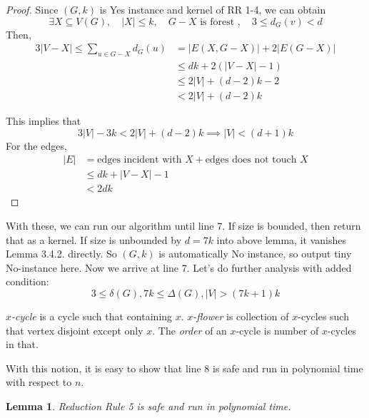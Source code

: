 \documentclass[12pt, a4paper, openany, twoside]{book}
\newtheorem{lem}[thm]{Lemma}
\theoremstyle{definition}
\theoremstyle{remark}
\theoremstyle{plain}
\numberwithin{equation}{section}
\begin{document}
\begin{proof}
    
Since $(G, k)$ is Yes instance and kernel of RR 1-4, we can obtain 
\[\exists X \subseteq V(G), \quad |X| \leq k, \quad G - X \text{ is forest }, \quad 3 \leq d_G(v) < d\]
Then, 
\begin{align*}
    3 |V - X| \leq \sum_{u \in G - X} d_G(u) &= \big| E(X, G-X) \big| + 2 \big| E(G-X) \big| \\
    & \leq dk + 2(|V - X| - 1) \tag{Remark 1} \\
    & \leq 2|V| + (d-2)k - 2 \\
    & < 2|V| + (d-2)k
\end{align*}

This implies that 
\[3|V| - 3k < 2|V| + (d-2)k \implies |V| < (d+1)k\]
For the edges, 
\begin{align*}
    |E| &= \text{edges incident with $X$} + \text{edges does not touch $X$} \\
    & \leq dk + |V - X| - 1 \\
    & < 2dk \tag{By Remark 1}
\end{align*}

\end{proof}

With these, we can run our algorithm until line 7. If size is bounded, then return that as a kernel.
If size is unbounded by $d = 7k$ into above lemma, it vanishes Lemma 3.4.2. directly. So $(G, k)$ is automatically No instance, 
so output tiny No-instance here. Now we arrive at line 7. Let's do further analysis with added condition: 
\[3 \leq \delta(G), 7k \leq \Delta(G), |V| > (7k + 1)k\]

\begin{tcolorbox}[colback=yellow!10!white,colframe=brown!75!black,title=$x$-cycle and $x$-flower]

\textit{$x$-cycle} is a cycle such that containing $x$. \textit{$x$-flower} is collection of $x$-cycles such that vertex disjoint 
except only $x$. The \textit{order} of an $x$-cycle is number of $x$-cycles in that. 

\end{tcolorbox}

With this notion, it is easy to show that line 8 is safe and run in polynomial time with respect to $n$. 

\begin{lem}
    
Reduction Rule 5 is safe and run in polynomial time.

\end{lem}
\end{document}
